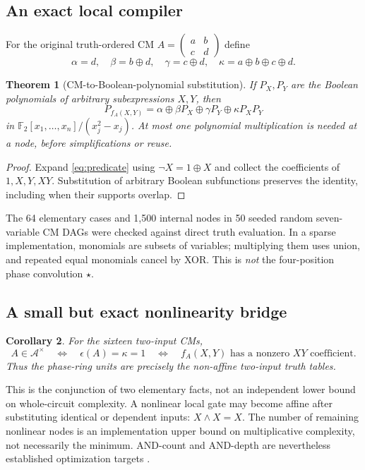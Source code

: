 \documentclass[11pt,a4paper]{article}
\newtheorem{theorem}{Theorem}[section]
\newtheorem{corollary}[theorem]{Corollary}
\theoremstyle{definition}\newtheorem{definition}[theorem]{Definition}
\theoremstyle{remark}\newtheorem{remark}[theorem]{Remark}
\newcommand{\F}{\mathbb F}
\newcommand{\alg}{\mathcal A}
\numberwithin{equation}{section}
\begin{document}
\subsection{An exact local compiler}
For the original truth-ordered CM $A=\left(\begin{smallmatrix}a&b\\c&d\end{smallmatrix}\right)$ define
\begin{equation}\label{eq:localcoeff}
 \alpha=d,\quad\beta=b\oplus d,\quad\gamma=c\oplus d,\quad
 \kappa=a\oplus b\oplus c\oplus d.
\end{equation}
\begin{theorem}[CM-to-Boolean-polynomial substitution]\label{thm:local}
If $P_X,P_Y$ are the Boolean polynomials of arbitrary subexpressions $X,Y$, then
\begin{equation}\label{eq:compiler}
 P_{f_A(X,Y)}=\alpha\oplus\beta P_X\oplus\gamma P_Y\oplus\kappa P_XP_Y
\end{equation}
in $\F_2[x_1,\ldots,x_n]/(x_j^2-x_j)$. At most one polynomial multiplication is needed at a node, before simplifications or reuse.
\end{theorem}
\begin{proof}
Expand \cref{eq:predicate} using $\neg X=1\oplus X$ and collect the coefficients of $1,X,Y,XY$. Substitution of arbitrary Boolean subfunctions preserves the identity, including when their supports overlap.
\end{proof}
The 64 elementary cases and 1,500 internal nodes in 50 seeded random seven-variable CM DAGs were checked against direct truth evaluation. In a sparse implementation, monomials are subsets of variables; multiplying them uses union, and repeated equal monomials cancel by XOR. This is \emph{not} the four-position phase convolution $\star$.

\subsection{A small but exact nonlinearity bridge}
\begin{corollary}\label{cor:nonlinear}
For the sixteen two-input CMs,
\begin{equation}
 A\in\alg^\times\quad\Longleftrightarrow\quad
 \epsilon(A)=\kappa=1\quad\Longleftrightarrow\quad
 f_A(X,Y)\text{ has a nonzero }XY\text{ coefficient}.
\end{equation}
Thus the phase-ring units are precisely the non-affine two-input truth tables.
\end{corollary}
This is the conjunction of two elementary facts, not an independent lower bound on whole-circuit complexity. A nonlinear local gate may become affine after substituting identical or dependent inputs: $X\land X=X$. The number of remaining nonlinear nodes is an implementation upper bound on multiplicative complexity, not necessarily the minimum. AND-count and AND-depth are nevertheless established optimization targets \cite{nist,xag}.
\end{document}
